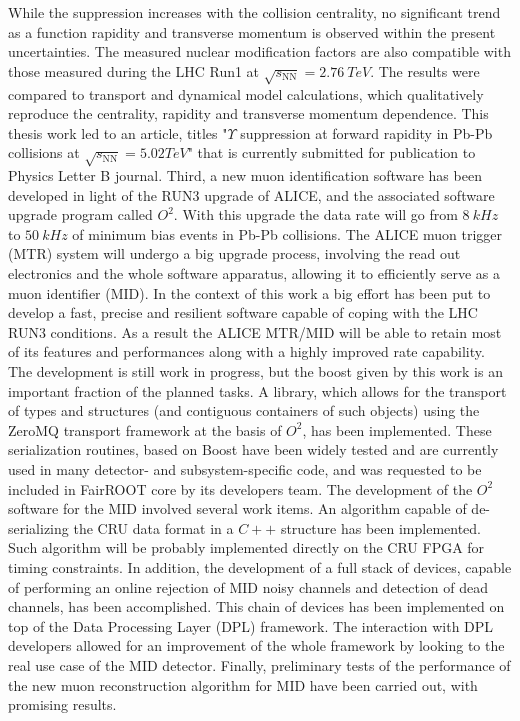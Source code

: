 While the suppression increases with the collision centrality, no significant trend as a function rapidity and transverse momentum is observed within the present uncertainties. 
The measured nuclear modification factors are also compatible with those measured during the LHC Run1 at $\sqrt{s_{\mathrm{NN}}}=2.76\ TeV$.
The results were compared to transport and dynamical model calculations, which qualitatively reproduce the centrality, rapidity and transverse momentum dependence.
This thesis work led to an article, titles "$\Upsilon$ suppression at forward rapidity in Pb-Pb collisions at $\sqrt{s_{\mathrm{NN}}} = 5.02 TeV$"\cite{MINE} that is currently submitted for publication to Physics Letter B journal.
Third, a new muon identification software has been developed in light of the RUN3 upgrade of ALICE, and the associated software upgrade program called $O^2$.
With this upgrade the data rate will go from $8\ kHz$ to $50\ kHz$ of minimum bias events in Pb-Pb collisions.
The ALICE muon trigger (MTR) system will undergo a big upgrade process, involving the read out electronics and the whole software apparatus, allowing it to efficiently serve as a muon identifier (MID).
In the context of this work a big effort has been put to develop a fast, precise and resilient software capable of coping with the LHC RUN3 conditions. 
As a result the ALICE MTR/MID will be able to retain most of its features and performances along with a highly improved rate capability. 
The development is still work in progress, but the boost given by this work is an important fraction of the planned tasks.
A library, which allows for the transport of  types and structures (and contiguous containers of such objects) using the ZeroMQ transport framework at the basis of $O^2$, has been implemented.
These serialization routines, based on Boost have been widely tested and are currently used in many detector- and subsystem-specific code, and was requested to be included in FairROOT core by its developers team. 
The development of the $O^2$ software for the MID involved several work items.
An algorithm capable of de-serializing the CRU data format in a $C++$ structure has been implemented.
Such algorithm will be probably implemented directly on the CRU FPGA for timing constraints.
In addition, the development of a full stack of devices, capable of performing an online rejection of MID noisy channels and detection of dead channels, has been accomplished.
This chain of devices has been implemented on top of the Data Processing Layer (DPL) framework.
The interaction with DPL developers allowed for an improvement of the whole framework by looking to the real use case of the MID detector.
Finally, preliminary tests of the performance of the new muon reconstruction algorithm for MID have been carried out, with promising results.
